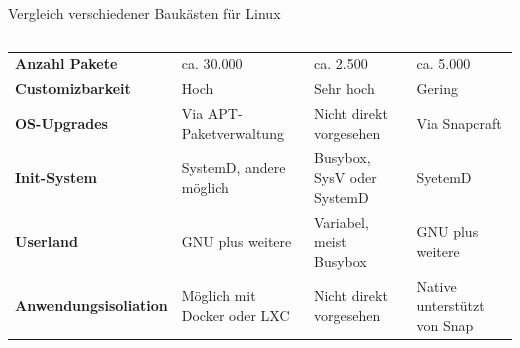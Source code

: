 {\begin{frame}{Vergleich verschiedener Baukästen für Linux}
\begin{columns}
\begin{tabular}{p{} p{} p{} p{}}
            \textbf{Anzahl Pakete} &
            ca. 30.000 & %
            ca. 2.500  & %
            ca. 5.000 \\ %

            \textbf{Customizbarkeit} &
            Hoch & %
            Sehr hoch & %
            Gering \\ %

            \textbf{OS-Upgrades} &
            Via APT-Paketverwaltung & %
            Nicht direkt vorgesehen & %
            Via Snapcraft \\ %

            \textbf{Init-System} &
            SystemD, andere möglich & %
            Busybox, SysV oder SystemD & %
            SyetemD \\ %

            \textbf{Userland} &
            GNU plus weitere  & %
            Variabel, meist Busybox & %
            GNU plus weitere \\ %

            \textbf{Anwendungsisoliation} &
            Möglich mit Docker oder LXC & %
            Nicht direkt vorgesehen & %
            Native unterstützt von Snap \\ %
        \end{tabular}
    \end{columns}
\end{frame}
}

